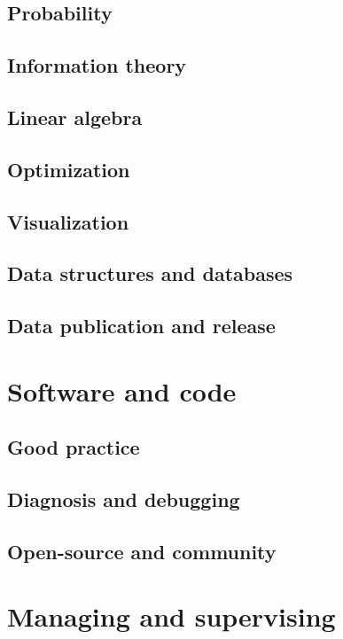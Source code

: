 \documentclass[12pt,letterpaper]{book}
\begin{document}
\chapter{Probability}

\chapter{Information theory}

\chapter{Linear algebra}

\chapter{Optimization}

\chapter{Visualization}

\chapter{Data structures and databases}

\chapter{Data publication and release}

\part{Software and code}

\chapter{Good practice}

\chapter{Diagnosis and debugging}

\chapter{Open-source and community}

\part{Managing and supervising}
\end{document}
